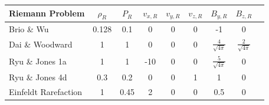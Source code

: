 \documentclass[modern, linenumbers]{aastex631}
\begin{document}
\begin{table}
\begin{tabular}{lcccccccccc}
    
    
    \end{tabular}
    \newline
    \newline
    \newline
    \begin{tabular}{lcccccccc}
    
    
    
    
    
        Riemann Problem & $\rho_R$ & $P_R$ & $v_{x,R}$ & $v_{y,R}$ & $v_{z,R}$ & $B_{y,R}$ & $B_{z,R}$ \\ \hline
    
        Brio \& Wu           & 0.128 & 0.1  & 0     & 0   & 0   & -1                      & 0                       \\ \hline
        Dai \& Woodward      & 1     & 1    & 0     & 0   & 0   & $\frac{4}{\sqrt{4\pi}}$ & $\frac{2}{\sqrt{4\pi}}$ \\ \hline
        Ryu \& Jones 1a      & 1     & 1    & -10   & 0   & 0   & $\frac{5}{\sqrt{4\pi}}$ & 0                       \\ \hline
        Ryu \& Jones 4d      & 0.3   & 0.2  & 0     & 0   & 1   & 1                       & 0                       \\ \hline
        Einfeldt Rarefaction & 1     & 0.45 & 2     & 0   & 0   & 0.5                     & 0                       \\ \hline
    

\end{tabular}
\end{table}
\end{document}
